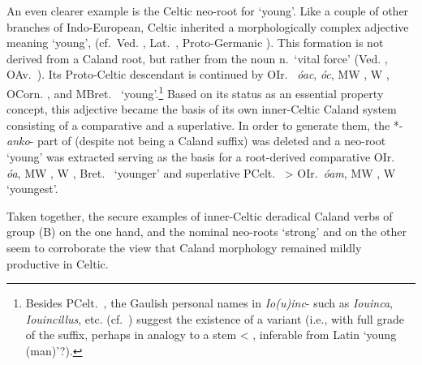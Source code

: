 \documentclass[output=paper,colorlinks,citecolor=brown]{langscibook}
\begin{document}
An even clearer example is the Celtic neo-root for ‘young’. Like a couple of other branches of Indo-European, Celtic inherited a morphologically complex adjective meaning ‘young’,  (cf.\ Ved. , Lat.\ , Proto-Germanic ). This formation is not derived from a Caland root, but rather from the noun  n.\ ‘vital force’ (Ved. , OAv.\ ). Its Proto-Celtic descendant  is continued  by OIr.\  \textit{óac}, \textit{óc}, MW , W , OCorn. , and MBret.\  ‘young’.\footnote{Besides PCelt.\ , the Gaulish personal names in \textit{Io(u)inc}-  such as \textit{Iouinca}, \textit{Iouincillus}, etc. (cf.\ \citealt[191--192]{Delamarre2003}) suggest the existence of a variant  (i.e., with full grade of the suffix, perhaps in analogy to a stem  < , inferable from Latin  ‘young (man)’?).} Based on its status as an essential property concept, this adjective became the basis of its own inner-Celtic Caland system   consisting of a comparative and a superlative. In order to generate them, the *-\textit{anko}- part of  (despite not being a Caland suffix)  was deleted and a neo-root  ‘young’ was extracted serving as the basis for a root-derived comparative OIr.\   \textit{óa}, MW , W , Bret.\  ‘younger’ and superlative PCelt.\  > OIr.\  \textit{óam}, MW , W  ‘youngest’. 

Taken together, the secure examples of inner-Celtic deradical Caland verbs  of group (B) on the one hand, and the nominal neo-roots  ‘strong’ and  on the other seem to corroborate the view that Caland morphology   remained mildly productive in Celtic.
\end{document}
